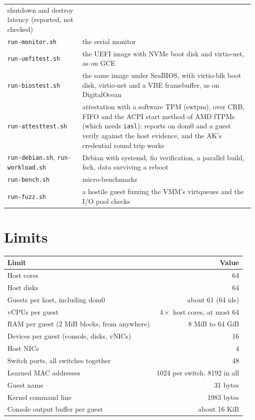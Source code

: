 \documentclass[11pt,a4paper]{report}
\newcommand{\cmd}[1]{\texttt{#1}}
\begin{document}
\begin{longtable}{@{}>{\raggedright\arraybackslash}p{5.6cm}>{\raggedright\arraybackslash}p{8.9cm}@{}}
  shutdown and destroy latency (reported, not checked) \\
\cmd{run-monitor.sh} & the serial monitor \\
\cmd{run-uefitest.sh} & the UEFI image with NVMe boot disk and virtio-net,
  as on GCE \\
\cmd{run-biostest.sh} & the same image under SeaBIOS, with virtio-blk boot
  disk, virtio-net and a VBE framebuffer, as on DigitalOcean \\
\cmd{run-attesttest.sh} & attestation with a software TPM (swtpm), over
  CRB, FIFO and the ACPI start method of AMD fTPMs (which needs
  \cmd{iasl}): reports on dom0 and a guest verify against the host
  evidence, and the AK's credential round trip works \\
\cmd{run-debian.sh}, \cmd{run-workload.sh} & Debian with systemd, fio
  verification, a parallel build, fsck, data surviving a reboot \\
\cmd{run-bench.sh} & micro-benchmarks \\
\cmd{run-fuzz.sh} & a hostile guest fuzzing the VMM's virtqueues and the
  I/O pool checks \\
\bottomrule
\end{longtable}
\endgroup

\appendix
\chapter{Limits}

\begin{longtable}{@{}lr@{}}
\toprule
Limit & Value \\
\midrule
Host cores & 64 \\
Host disks & 64 \\
Guests per host, including dom0 & about 61 (64 ids) \\
vCPUs per guest & $4\times$ host cores, at most 64 \\
RAM per guest (2 MiB blocks, from anywhere) & 8 MiB to 64 GiB \\
Devices per guest (console, disks, vNICs) & 16 \\
Host NICs & 4 \\
Switch ports, all switches together & 48 \\
Learned MAC addresses & 1024 per switch, 8192 in all \\
Guest name & 31 bytes \\
Kernel command line & 1983 bytes \\
Console output buffer per guest & about 16 KiB \\
\bottomrule
\end{longtable}
\end{document}
